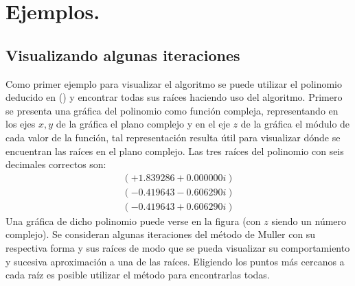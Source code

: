 \section{Ejemplos.}
\subsection{Visualizando algunas iteraciones}
Como primer ejemplo para visualizar el algoritmo se puede utilizar el polinomio deducido en
() y encontrar todas sus raíces haciendo uso del algoritmo. Primero se presenta
una gráfica del polinomio como función compleja, representando en los ejes $x,y$ de la gráfica el plano
complejo y en el eje $z$ de la gráfica el módulo de cada valor de la función, tal representación resulta útil para visualizar
dónde se encuentran las raíces en el plano complejo. Las tres raíces del polinomio con seis decimales 
correctos son: 
\begin{align*}
    \left(+1.839286+0.000000i\right)\\(-0.419643-0.606290i)\\(-0.419643+0.606290i)
\end{align*}
Una gráfica de dicho polinomio puede verse en la figura  (con $z$ siendo un número complejo).
Se consideran algunas iteraciones del método de Muller con su respectiva forma y sus raíces de modo que se pueda visualizar
su comportamiento y sucesiva aproximación a una de las raíces. Eligiendo los puntos más cercanos a cada raíz
es posible utilizar el método para encontrarlas todas.


